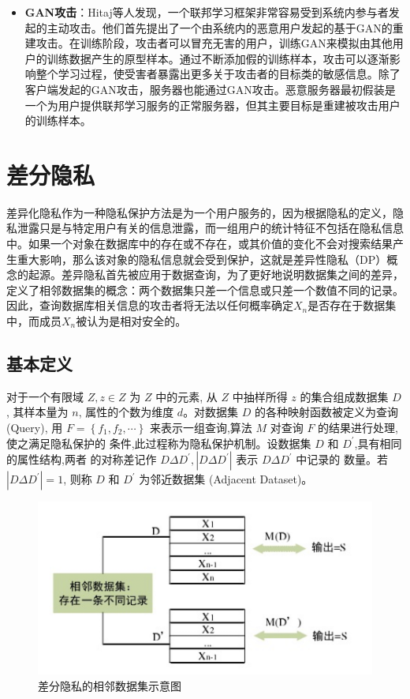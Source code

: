 \begin{itemize}
\item \textbf{GAN攻击}：Hitaj等人\cite{ref27}发现，一个联邦学习框架非常容易受到系统内参与者发起的主动攻击。他们首先提出了一个由系统内的恶意用户发起的基于GAN的重建攻击。在训练阶段，攻击者可以冒充无害的用户，训练GAN来模拟由其他用户的训练数据产生的原型样本。通过不断添加假的训练样本，攻击可以逐渐影响整个学习过程，使受害者暴露出更多关于攻击者的目标类的敏感信息。除了客户端发起的GAN攻击，服务器也能通过GAN攻击。恶意服务器最初假装是一个为用户提供联邦学习服务的正常服务器，但其主要目标是重建被攻击用户的训练样本。

\end{itemize}


\section{差分隐私}
差异化隐私作为一种隐私保护方法是为一个用户服务的，因为根据隐私的定义，隐私泄露只是与特定用户有关的信息泄露，而一组用户的统计特征不包括在隐私信息中。如果一个对象在数据库中的存在或不存在，或其价值的变化不会对搜索结果产生重大影响，那么该对象的隐私信息就会受到保护，这就是差异性隐私（DP）概念的起源。差异隐私首先被应用于数据查询，为了更好地说明数据集之间的差异，定义了相邻数据集的概念：两个数据集只差一个信息或只差一个数值不同的记录\cite{ref28}。因此，查询数据库相关信息的攻击者将无法以任何概率确定$X_{n}$是否存在于数据集中，而成员$X_{n}$被认为是相对安全的。


\subsection{基本定义}
对于一个有限域 $Z, z \in Z$ 为 $Z$ 中的元素, 从 $Z$ 中抽样所得 $z$ 的集合组成数据集 $D$, 其样本量为 $n$, 属性的个数为维度 $d$。对数据集 $D$ 的各种映射函数被定义为查询 (Query), 用 $F=\left\{f_{1}, f_{2}, \cdots\right\}$ 来表示一组查询,算法 $M$ 对查询 $F$ 的结果进行处理,使之满足隐私保护的 条件,此过程称为隐私保护机制。设数据集 $D$ 和 $D^{\prime}$,具有相同的属性结构,两者 的对称差记作 $D \Delta D^{\prime},\left|D \Delta D^{\prime}\right|$ 表示 $D \Delta D^{\prime}$ 中记录的 数量。若 $\left|D \Delta D^{\prime}\right|=1$, 则称 $D$ 和 $D^{\prime}$ 为邻近数据集 (Adjacent Dataset)。
\begin{figure}[!hbt]
\centering
	\includegraphics[scale=0.7]{fig2/C2/相邻数据集示意图}%
	\caption{差分隐私的相邻数据集示意图}
	\label{fig:相邻数据集示意图}	
\end{figure}


